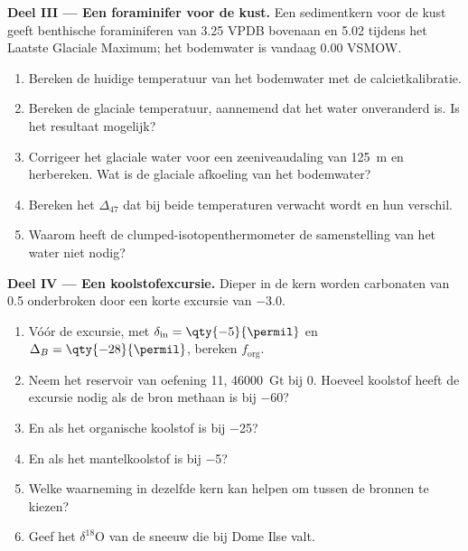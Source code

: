 \begin{problem}
\medskip\noindent\textbf{Deel III --- Een foraminifer voor de kust.} Een
sedimentkern voor de kust geeft benthische foraminiferen van \qty{3.25}{\permil}
VPDB bovenaan en \qty{5.02}{\permil} tijdens het Laatste Glaciale Maximum; het
bodemwater is vandaag \qty{0.00}{\permil} VSMOW.
\begin{enumerate}[resume]
\item Bereken de huidige temperatuur van het bodemwater met de
calcietkalibratie.
\item Bereken de glaciale temperatuur, aannemend dat het water onveranderd is. Is
het resultaat mogelijk?
\item Corrigeer het glaciale water voor een zeeniveaudaling van \qty{125}{m} en
herbereken. Wat is de glaciale afkoeling van het bodemwater?
\item Bereken het $\Delta_{47}$ dat bij beide temperaturen verwacht wordt en hun
verschil.
\item Waarom heeft de clumped-isotopenthermometer de samenstelling van
het water niet nodig?
\end{enumerate}

\medskip\noindent\textbf{Deel IV --- Een koolstofexcursie.} Dieper in de kern
worden carbonaten van \qty{+0.5}{\permil} onderbroken door een korte excursie van
\qty{-3.0}{\permil}.
\begin{enumerate}[resume]
\item Vóór de excursie, met $\delta_{\mathrm{in}} = \qty{-5}{\permil}$ en
$\Delta_B = \qty{-28}{\permil}$, bereken $f_{\mathrm{org}}$.
\item Neem het reservoir van oefening 11, \qty{46000}{Gt} bij 0. Hoeveel koolstof
heeft de excursie nodig als de bron methaan is bij \qty{-60}{\permil}?
\item En als het organische koolstof is bij \qty{-25}{\permil}?
\item En als het mantelkoolstof is bij \qty{-5}{\permil}?
\item Welke waarneming in dezelfde kern kan helpen om tussen de
bronnen te kiezen?
\item Geef het $\delta^{18}\mathrm O$ van de sneeuw die bij Dome Ilse valt.
\end{enumerate}
\end{problem}
